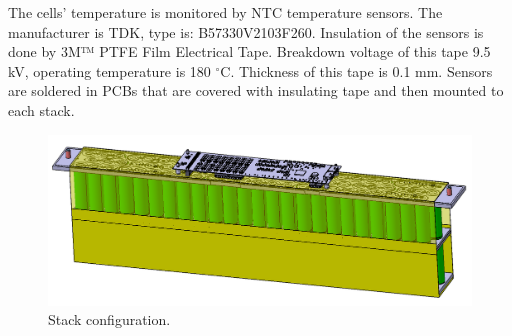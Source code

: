 The cells’ temperature is monitored by NTC temperature sensors. The manufacturer is TDK, type is: B57330V2103F260. Insulation of the sensors is done by 3M™ PTFE Film Electrical Tape. Breakdown voltage of this tape 9.5 kV, operating temperature is 180 $^\circ$C. Thickness of this tape is 0.1 mm. Sensors are soldered in PCBs that are covered with insulating tape and then mounted to each stack. 

\begin{figure}[H]
	\centering
	\includegraphics[width=\textwidth]{./img/ACP-stack.png}
	\caption{Stack configuration.}
	\label{fig:acp-stack}
\end{figure}

